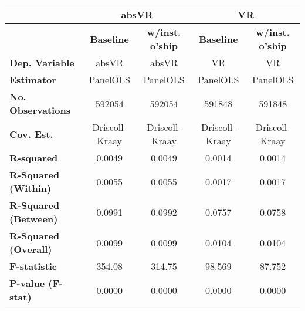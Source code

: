 {\begin{longtable}{>{\bfseries}lcccc}
\toprule
 & \multicolumn{2}{c}{\textbf{absVR}} &  \multicolumn{2}{c}{\textbf{VR}}\\
\midrule
 &   \textbf{Baseline}   & \textbf{w/inst. o'ship} &   \textbf{Baseline}  & \textbf{w/inst. o'ship}  \\
\midrule
\textbf{Dep. Variable}                     &       absVR        &              absVR              &         VR         &             VR              \\
\textbf{Estimator}                         &      PanelOLS      &             PanelOLS            &      PanelOLS      &          PanelOLS           \\
\textbf{No. Observations}                  &       592054       &              592054             &       591848       &           591848            \\
\textbf{Cov. Est.}                         &   Driscoll-Kraay   &          Driscoll-Kraay         &   Driscoll-Kraay   &       Driscoll-Kraay        \\
\textbf{R-squared}                         &       0.0049       &              0.0049             &       0.0014       &           0.0014            \\
\textbf{R-Squared (Within)}                &       0.0055       &              0.0055             &       0.0017       &           0.0017            \\
\textbf{R-Squared (Between)}               &       0.0991       &              0.0992             &       0.0757       &           0.0758            \\
\textbf{R-Squared (Overall)}               &       0.0099       &              0.0099             &       0.0104       &           0.0104            \\
\textbf{F-statistic}                       &       354.08       &              314.75             &       98.569       &           87.752            \\
\textbf{P-value (F-stat)}                  &       0.0000       &              0.0000             &       0.0000       &           0.0000            \\
\bottomrule
\end{longtable}
}
